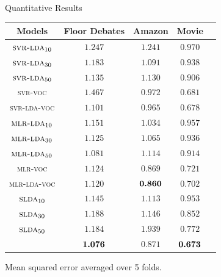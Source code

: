 \documentclass[compress]{beamer}
\newcommand{\abr}[1]{\textsc{#1}}
\newcommand{\lda}[0]{\abr{lda}}
\newcommand{\slda}[0]{\abr{slda}}
\newcommand{\bm}[1]{\mbox{\boldmath$#1$}}
\begin{document}
\begin{frame}{Quantitative Results}

\centering

\begin{tabular}{|c||c|c|c|c|}
  \hline
Models & Floor Debates & Amazon & Movie \\
  \hline
  $\textsc{svr-}\lda{}_{10}$     & $1.247$       & $1.241$ & $0.970$ \\
  $\textsc{svr-}\lda{}_{30}$     & $1.183$       & $1.091$ & $0.938$ \\
  $\textsc{svr-}\lda{}_{50}$     & $1.135$       & $1.130$ & $0.906$ \\
  {\textsc{svr-voc}}             & $1.467$       & $0.972$ & $0.681$\\
  {\textsc{svr-lda-voc}}         & $1.101$       & $0.965$ & $0.678$\\ \hline \hline
  $\textsc{mlr-}\lda{}_{10}$     & $1.151$       & $1.034$ & $0.957$ \\
  $\textsc{mlr-}\lda{}_{30}$     & $1.125$       & $1.065$ &$0.936$ \\
  $\textsc{mlr-}\lda{}_{50}$     & $1.081$       & $1.114$ & $0.914$ \\
  {\textsc{mlr-voc}}             & $1.124$       & $0.869$ & $0.721$\\
  {\textsc{mlr-lda-voc}}         & $1.120$       & $\bm {0.860}$ & $0.702$\\\hline \hline
  $\slda{}_{10}$                 & $1.145$       & $1.113$ & $0.953$\\
  $\slda{}_{30}$                 & $1.188$       & $1.146$ & $0.852$\\
  $\slda{}_{50}$                 & $1.184$       & $1.939$ & $0.772$\\ \hline \hline
  {\shlda{}}                     & $\bm {1.076}$ & $0.871$ & $\bm {0.673}$\\ \hline
\end{tabular}

Mean squared error averaged over 5 folds.
\end{frame}
\end{document}
